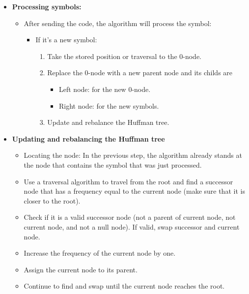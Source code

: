 \begin{enumerate}[label=\textbf{\Alph*.}]
\begin{itemize}
\begin{itemize}
        \end{itemize}
        \item \textbf{Processing symbols:}
        \begin{itemize}
           \item After sending the code, the algorithm will process the symbol:
                \begin{itemize}
                    \item If it’s a new symbol:
                        \begin{enumerate}[label={•}]
                            \item Take the stored position or traversal to the 0-node.
                            \item Replace the 0-node with a new parent node and its childs are
                            \begin{itemize}
                                \item Left node: for the new 0-node.
                                \item Right node: for the new symbols.
                            \end{itemize}
                            \item Update and rebalance the Huffman tree.
                        \end{enumerate}
                \end{itemize}
        \end{itemize}
        \item \textbf{Updating and rebalancing the Huffman tree}
        \begin{itemize}
            \item Locating the node: In the previous step, the algorithm already stands at the node that contains the symbol that was just processed.
            \item Use a traversal algorithm to travel from the root and find a successor node that has a frequency equal to the current node (make sure that it is closer to the root). 
            \item Check if it is a valid successor node (not a parent of current node, not current node, and not a null node). If valid, swap successor and current node. 
            \item Increase the frequency of the current node by one.
            \item Assign the current node to its parent.
            \item Continue to find and swap until the current node reaches the root.

\end{itemize}
\end{itemize}
\end{enumerate}
